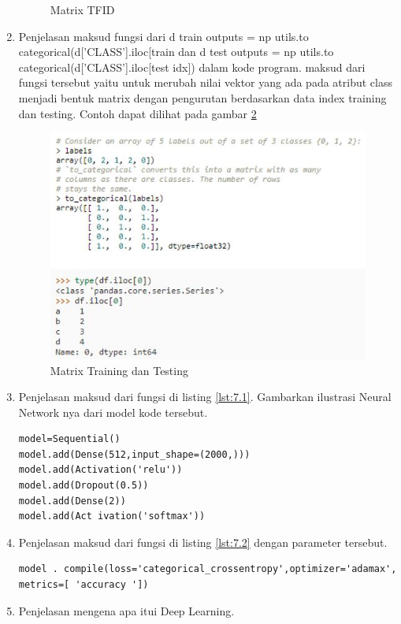 \begin{enumerate}
\begin{figure}[!htbp]
\caption{Matrix TFID}
\label{c7t_4}
\end{figure}
\item Penjelasan maksud fungsi dari d train outputs = np utils.to categorical(d['CLASS'].iloc[train dan d test outputs = np utils.to categorical(d['CLASS'].iloc[test idx]) dalam kode program.
\subitem maksud dari fungsi tersebut yaitu untuk merubah nilai vektor yang ada pada atribut class menjadi bentuk matrix dengan pengurutan berdasarkan data index training dan testing. Contoh dapat dilihat pada gambar \ref{c7t_5}
\begin{figure}[!htbp]
\centerline{\includegraphics[width=1\textwidth]{figures/c7t/5.JPG}}
\caption{Matrix Training dan Testing}
\label{c7t_5}
\end{figure}
\item Penjelasan maksud dari fungsi di listing \ref{lst:7.1}. Gambarkan ilustrasi Neural Network nya dari model kode tersebut.
\begin{lstlisting}[caption=Neural Network,label={lst:7.1}]
model=Sequential()
model.add(Dense(512,input_shape=(2000,)))
model.add(Activation('relu'))
model.add(Dropout(0.5))
model.add(Dense(2))
model.add(Act ivation('softmax'))
\end{lstlisting}
\item Penjelasan maksud dari fungsi di listing \ref{lst:7.2} dengan parameter tersebut.
\begin{lstlisting}[caption=Model Compile Metric,label={lst:7.2}]
model . compile(loss='categorical_crossentropy',optimizer='adamax',
metrics=[ 'accuracy '])
\end{lstlisting}
\item Penjelasan mengena apa itui Deep Learning.

\end{enumerate}
